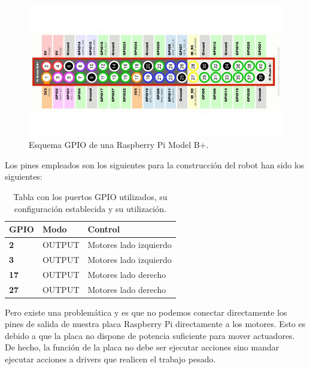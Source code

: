 \begin{figure}[H]
  \begin{center}
    \includegraphics[scale=0.4]{imagenes/robot/gpio-conexiones.jpg}
  \end{center}
  \caption{Esquema GPIO de una Raspberry Pi Model B+.}
  \label{gantt:tareas01}
\end{figure}

Los pines empleados son los siguientes para la construcción del robot han sido los siguientes:\\

\begin{table}[H]
  \begin{center}
    \begin{tabular}{|p{2.5cm}|p{2.5cm}|p{4.5cm}|}
      \hline
      {\textbf{GPIO}} & \textbf{ Modo } & \textbf{ Control }\\
      \hline
      {\textbf{ 2 }} & { OUTPUT } & { Motores lado izquierdo }  \\
     \hline
      {\textbf{ 3 }} & { OUTPUT } & { Motores lado izquierdo } \\
      \hline
      {\textbf{ 17 }} & { OUTPUT } & {  Motores lado derecho } \\
      \hline
      {\textbf{ 27 }} & { OUTPUT } & { Motores lado derecho } \\
     \hline   
    \end{tabular}
  \end{center}
\caption{ Tabla con los puertos GPIO utilizados, su configuración establecida y su utilización. }
\end{table}


Pero existe una problemática y es que no podemos conectar directamente los pines de salida de nuestra placa Raspberry Pi directamente a los motores. Esto es debido a
que la placa no dispone de potencia suficiente para mover actuadores. De hecho, la función de la placa no debe ser ejecutar acciones sino mandar ejecutar acciones a drivers que realicen
el trabajo pesado.\\

